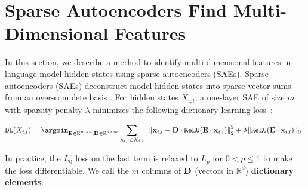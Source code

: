 \documentclass{article} %
\DeclareRobustCommand{\revOne}[1]{#1}
\theoremstyle{plain}
\theoremstyle{definition}
\newcommand{\josh}[1]{{\color{orange}{\bf Josh:} #1}}
\begin{document}
\section{Sparse Autoencoders Find Multi-Dimensional Features}
\label{sec:sae_search}



\revOne{In this section, we describe a method to identify multi-dimensional features in language model hidden states using sparse autoencoders (SAEs)}. Sparse autoencoders (SAEs) deconstruct model hidden states into sparse vector sums from an over-complete basis \citep{dictionary_monosemanticity_anthropic, other_sae_paper}. For hidden states $X_{i, l}$, a one-layer SAE of size $m$ with sparsity penalty $\lambda$ minimizes the following dictionary learning loss~\citep{dictionary_monosemanticity_anthropic, other_sae_paper}:

\begin{align}
\texttt{DL}(X_{i, l}) = \argmin_{\substack{\E \in \mathbb{R}^{m \times d}, \D \in \mathbb{R}^{d \times m}}} \sum_{\x_{i, l} \in X_{i, l}} \left[ \left \lVert \x_{i, l} - \D \cdot \texttt{ReLU}(\E \cdot \x_{i, l})  \right \rVert_2^2 + \lambda \lVert \texttt{ReLU}(\E \cdot \x_{i, l}) \rVert_0\right] 
\label{eqn:dict}
\end{align}


In practice, the $L_0$ loss on the last term is relaxed to $L_p$ for $0 < p \leq 1$ to make the loss differentiable. We call the $m$ columns of ${\mathbf D}$ (vectors in $\mathbb{R}^d$) \textbf{ dictionary elements}. 
\end{document}
